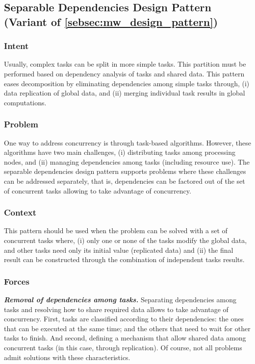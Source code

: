 \subsection{Separable Dependencies Design Pattern (Variant of \ref{sebsec:mw_design_pattern})}

\subsubsection{Intent}

Usually, complex tasks can be split in more simple tasks. This partition must be performed based on dependency analysis of tasks and shared data. This pattern eases decomposition by eliminating dependencies among simple tasks through, (i) data replication of global data, and (ii) merging individual task results in global computations.

\subsubsection{Problem}

One way to address concurrency is through task-based algorithms. However, these algorithms have two main challenges, (i) distributing tasks among processing nodes, and (ii) managing dependencies among tasks (including resource use). The separable dependencies design pattern supports problems where these challenges can be addressed separately, that is, dependencies can be factored out of the set of concurrent tasks allowing to take advantage of concurrency.

\subsubsection{Context}

This pattern should be used when the problem can be solved with a set of concurrent tasks where, (i) only one or none of the tasks modify the global data, and other tasks need only its initial value (replicated data) and (ii) the final result can be constructed through the combination of independent tasks results.

\subsubsection{Forces}

\textbf{\textit{Removal of dependencies among tasks. }}Separating dependencies among tasks and resolving how to share required data allows to take advantage of concurrency. First, tasks are classified according to their dependencies: the ones that can be executed at the same time; and the others that need to wait for other tasks to finish. And second, defining a mechanism that allow shared data among concurrent tasks (in this case, through replication). Of course, not all problems admit solutions with these characteristics. 

